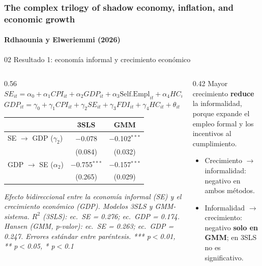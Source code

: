 \documentclass[serif, aspectratio=169]{beamer}
\newcommand{\paperframe}{%
  \frametitle{The complex trilogy of shadow economy, inflation, and economic growth}%
  \framesubtitle{Rdhaounia y Elweriemmi (2026)}}
\begin{document}
\begin{frame}
\paperframe
\begin{block}{02 \quad Resultado 1: economía informal y crecimiento económico}\end{block}
\begin{columns}[T]
\begin{column}{0.56\textwidth}
\centering
{\scriptsize
$SE_{it} = \alpha_0 + \alpha_1 CPI_{it} + \alpha_2 GDP_{it} + \alpha_3 \text{Self.Empl}_{it} + \alpha_4 HC_{it} + \lambda_{it}$\\[2pt]
$GDP_{it} = \gamma_0 + \gamma_1 CPI_{it} + \gamma_2 SE_{it} + \gamma_3 FDI_{it} + \gamma_4 HC_{it} + \theta_{it}$}

\vspace{4pt}
{\scriptsize
\begin{tabular}{lcc}
\toprule
 & \textbf{3SLS} & \textbf{GMM} \\
\midrule
SE $\rightarrow$ GDP ($\gamma_2$)  & $-$0.078 & $-$0.102$^{***}$ \\
                                   & (0.084) & (0.032) \\
GDP $\rightarrow$ SE ($\alpha_2$)  & $-$0.755$^{***}$ & $-$0.157$^{***}$ \\
                                   & (0.265) & (0.029) \\
\bottomrule
\end{tabular}}

\vspace{2pt}
{\tiny\itshape Efecto bidireccional entre la economía informal (SE) y el crecimiento económico (GDP). Modelos 3SLS y GMM-sistema.
$R^2$ (3SLS): ec.\ SE = 0.276; ec.\ GDP = 0.174. Hansen (GMM, p-valor): ec.\ SE = 0.263; ec.\ GDP = 0.247.
Errores estándar entre paréntesis. *** p$<$0.01, ** p$<$0.05, * p$<$0.1}
\end{column}
\begin{column}{0.42\textwidth}
\small
Mayor crecimiento \textbf{reduce} la informalidad, porque expande el empleo formal y los incentivos al cumplimiento.
\begin{itemize}
  \item Crecimiento $\rightarrow$ informalidad: negativo en ambos métodos.
  \item Informalidad $\rightarrow$ crecimiento: negativo \textbf{solo en GMM}; en 3SLS no es significativo.
\end{itemize}
\end{column}
\end{columns}
\end{frame}
\end{document}
